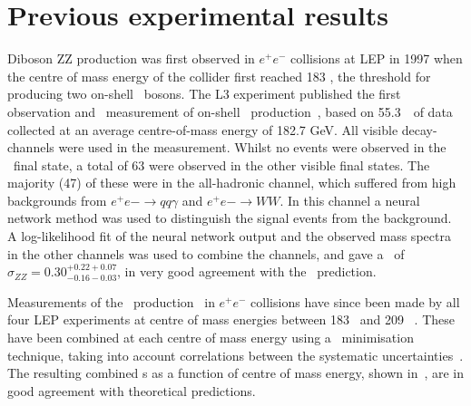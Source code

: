 
%
\section{Previous experimental results}
\label{sec:TheoryZZProduction-prevResults}

Diboson ZZ production was first observed in $e^+e^-$ collisions at LEP in 1997
when the centre of mass energy of the collider first reached 183 \gev, the
threshold for producing two on-shell \Z\ bosons.
The L3 experiment published the first observation and \cx\ measurement
of on-shell \ZZ\ production~\cite{Acciarri1999281}, based on 55.3~\ipb\
of data collected at an average centre-of-mass energy of 182.7 GeV. All visible
decay-channels were used in the measurement. Whilst no events were
observed in the \llll\ final state, a total of 63 were observed in
the other visible final states. The majority (47) of these were in the
all-hadronic channel, which suffered from high backgrounds from $e^+e-
\rightarrow qq \gamma$ and $e^+e- \rightarrow WW$. In this channel a neural
network method was used to distinguish the signal events from the background. A
log-likelihood fit of the neural network output and the observed mass spectra in
the other channels was used to combine the channels, and gave a \cx\ of
$\sigma_{ZZ} = 0.30^{+0.22 +0.07}_{-0.16 -0.03}$, in very good agreement with
the \sm\ prediction. 

Measurements of the \ZZ\ production \cx\ in $e^+e^-$ collisions have since
been made by all four LEP experiments at centre of mass energies between 183
\gev\ and 209
\gev~\cite{Abbiendi:2003va,Abdallah:2003dv,Acciarri:1999ug,Schael:1166743}.
These have been combined at each centre of mass energy using a \chisquared\
minimisation technique, taking into account correlations between the systematic
uncertainties~\cite{bib:LEPEW2006}. The resulting combined \cx s as a
function of centre of mass energy, shown in~\fig{lep-cx}, are in good agreement with
theoretical predictions.

